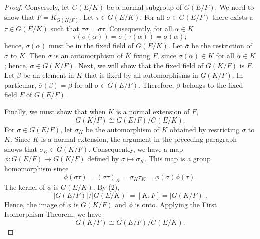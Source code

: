 \begin{proof}
 
Conversely, let $G(E/K)$ be a normal subgroup of $G(E/F)$. We need to
show that $F = K_{G(K/F)}$. Let $\tau \in G(E/K)$. For all $\sigma
\in G(E/F)$ there exists a $\overline{\tau} \in G(E/K)$ such that
$\tau \sigma = \sigma \overline{\tau}$.  Consequently, for all $\alpha
\in K$
\[
\tau( \sigma( \alpha ) )
= \sigma( \overline{\tau}( \alpha ) )
= \sigma( \alpha );
\]
hence, $\sigma( \alpha )$ must be in the fixed field of $G(E/K)$.
Let $\overline{\sigma}$ be the restriction of $\sigma$ to $K$. Then
$\overline{\sigma}$ is an automorphism of $K$ fixing $F$, since
$\sigma( \alpha ) \in K$ for all $\alpha \in K$; hence,
$\overline{\sigma} \in G(K/F)$. Next, we will show that the fixed
field of $G(K/F)$ is $F$. Let $\beta$ be an element in $K$ that is
fixed by all automorphisms in $G(K/F)$.  In particular,
$\overline{\sigma}(\beta) = \beta$ for all $\sigma \in G(E/F)$. 
Therefore, $\beta$ belongs to the fixed field $F$ of $G(E/F)$.
 
 
Finally, we must show that when $K$ is a normal extension of $F$, 
\[
G(K/F) \cong G(E/F) / G(E/K).
\]
For $\sigma \in G(E/F)$, let $\sigma_K$ be the automorphism of $K$
obtained by restricting $\sigma$ to $K$. Since $K$ is a normal
extension, the argument in the preceding paragraph shows that
$\sigma_K \in G( K/F)$. Consequently, we have a map \mbox{$\phi:G(E/F)
\rightarrow G(K/F)$} defined by $\sigma \mapsto \sigma_K$. This map is
a group homomorphism since
\[
\phi( \sigma \tau ) 
= (\sigma \tau)_K 
= \sigma_K \tau_K 
= \phi( \sigma) \phi( \tau ).
\]
The kernel of $\phi$ is $G(E/K)$.  By (2), 
\[
|G(E/F)| / |G(E/K)| = [K:F] = |G(K/F)|.
\]
Hence, the image of $\phi$ is $G(K/F)$ and $\phi$ is 
onto. Applying the First Isomorphism Theorem, we have
\[
G(K/F) \cong G(E/F) / G( E/K ).
\]
\end{proof}
 
 

